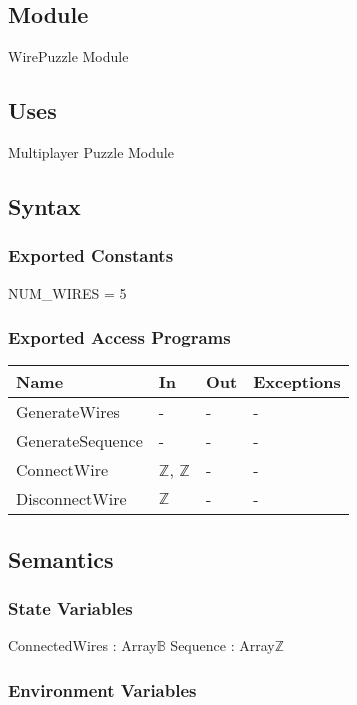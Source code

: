 \documentclass[12pt, titlepage]{article}
\begin{document}
\subsection{Module}
WirePuzzle Module
\subsection{Uses}
Multiplayer Puzzle Module

\subsection{Syntax}

\subsubsection{Exported Constants}
NUM\_WIRES = 5

\subsubsection{Exported Access Programs}

\begin{center}
\begin{tabular}{p{4cm} p{3cm} p{3cm} p{3cm}}
\hline
\textbf{Name} & \textbf{In} & \textbf{Out} & \textbf{Exceptions} \\
\hline
GenerateWires & - & - & - \\
GenerateSequence & - & - & - \\
ConnectWire & $\mathds{Z}$, $\mathds{Z}$ & - & - \\
DisconnectWire & $\mathds{Z}$ & - & - \\
\hline
\end{tabular}
\end{center}

\subsection{Semantics}

\subsubsection{State Variables}

ConnectedWires : Array\textlangle$\mathds{B}$\textrangle \newline
Sequence : Array\textlangle$\mathds{Z}$\textrangle

\subsubsection{Environment Variables}
\end{document}
